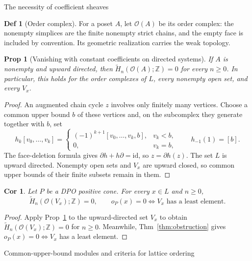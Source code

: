 \documentclass[10pt,letterpaper]{amsart}
\makeatletter
\numberwithin{equation}{section}
\newtheorem{prop}[thm]{Prop}
\newtheorem{cor}[thm]{Cor}
\theoremstyle{definition}
\newtheorem{defn}{Def}[section]
\newcommand{\Z}{\mathbb Z}
\newcommand{\id}{\mathrm{id}}
\newcommand{\ord}{\mathcal O}
\def\section{\@startsection{section}{1}
  \z@{1.1\linespacing\@plus.5\linespacing}{.6\linespacing}
  {\normalfont\fontsize{13}{16}\selectfont\bfseries\boldmath\centering}}
\def\subsection{\@startsection{subsection}{2}
  \z@{.9\linespacing\@plus.3\linespacing}{.4\linespacing}
  {\normalfont\fontsize{11.5}{14}\selectfont\bfseries\boldmath\raggedright}}
\makeatother
\begin{document}
\subsection{The necessity of coefficient sheaves}
\begin{defn}[Order complex]\label{def:order-complex}
For a poset $A$, let $\ord(A)$ be its order complex: the nonempty simplices are the finite nonempty strict chains, and the empty face is included by convention. Its geometric realization carries the weak topology.
\end{defn}

\begin{prop}[Vanishing with constant coefficients on directed systems]\label{prop:directed-acyclic}
If $A$ is nonempty and upward directed, then $\widetilde H_n(\ord(A);\Z)=0$ for every $n\ge0$. In particular, this holds for the order complexes of $L$, every nonempty open set, and every $V_x$.
\end{prop}
\begin{proof}
An augmented chain cycle $z$ involves only finitely many vertices. Choose a common upper bound $b$ of these vertices and, on the subcomplex they generate together with $b$, set
\[
h_k[v_0,\ldots,v_k]=
\begin{cases}
(-1)^{k+1}[v_0,\ldots,v_k,b],&v_k<b,\\
0,&v_k=b,
\end{cases}
\qquad h_{-1}(1)=[b].
\]
The face-deletion formula gives $\partial h+h\partial=\id$, so $z=\partial h(z)$.
The set $L$ is upward directed. Nonempty open sets and $V_x$ are upward closed, so common upper bounds of their finite subsets remain in them.
\end{proof}

\begin{cor}\label{cor:coeff-necessary}
Let $P$ be a DPO positive cone. For every $x\in L$ and $n\ge0$,
\[
\widetilde H_n(\ord(V_x);\Z)=0,
\qquad
o_P(x)=0\iff V_x\text{ has a least element}.
\]
\end{cor}
\begin{proof}
Apply Prop~\ref{prop:directed-acyclic} to the upward-directed set $V_x$ to obtain $\widetilde H_n(\ord(V_x);\Z)=0$ for $n\ge0$. Meanwhile, Thm~\ref{thm:obstruction} gives $o_P(x)=0\iff V_x$ has a least element.
\end{proof}

\section{Common-upper-bound modules and criteria for lattice ordering}
\end{document}
